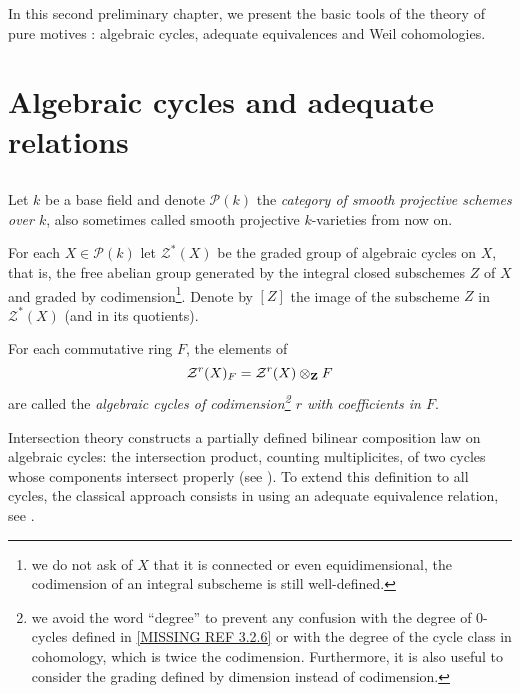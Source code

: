 \documentclass[../main.tex]{subfiles}
\begin{document}
In this second preliminary chapter, we present the basic tools of the theory of pure motives : algebraic cycles, adequate equivalences and Weil cohomologies.

\section{Algebraic cycles and adequate relations}

\subsection{} Let $k$ be a base field and denote $\mathcal{P}(k)$ the \emph{category of smooth projective schemes over $k$}, also sometimes called smooth projective $k$-varieties from now on.

For each $X \in \mathcal{P}(k)$ let $\mathcal{Z}^*(X)$ be the graded group of algebraic cycles on $X$, that is, the free abelian group generated by the integral closed subschemes $Z$ of $X$ and graded by codimension\footnote{we do not ask of $X$ that it is connected or even equidimensional, the codimension of an integral subscheme is still well-defined.}.
Denote by $[Z]$ the image of the subscheme $Z$ in $\mathcal{Z}^*(X)$ (and in its quotients).

For each commutative ring $F$, the elements of
$$\mathcal{Z}^r(X)_F = \mathcal{Z}^r(X) \otimes_{\mathbf{Z}} F$$
are called the \emph{algebraic cycles of codimension\footnote{we avoid the word \enquote{degree} to prevent any confusion with the degree of $0$-cycles defined in \ref{MISSING REF 3.2.6} or with the degree of the cycle class in cohomology, which is twice the codimension. Furthermore, it is also useful to consider the grading defined by dimension instead of codimension.} $r$ with coefficients in $F$}.

Intersection theory constructs a partially defined bilinear composition law on algebraic cycles: the intersection product, counting multiplicites, of two cycles whose components intersect properly (see \cite{se57}).
To extend this definition to all cycles, the classical approach consists in using an adequate equivalence relation, see \cite{sa58}.
\end{document}
